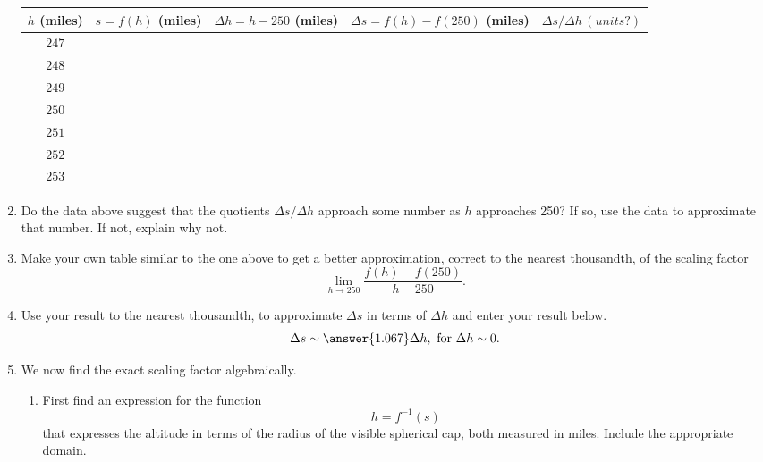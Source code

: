 \documentclass{ximera}
\begin{document}
\begin{question}
\begin{enumerate}
\begin{center}
  \begin{tabular}{ | c| c | c | c | c |}
    \hline
    $h$ (miles) & $s = f(h)$ (miles) & $\Delta h = h-250$ (miles)  & $\Delta s =f(h) - f(250)$ (miles) & $\Delta s/\Delta h \, (units?)$ \\ \hline
     $247$ &  &  &   & \\ \hline
    $248$ &  &  &   & \\ \hline
    $249$ &  &  &   &  \\ \hline
    $250$  &  &  &  &   \\ \hline
    $251$ &  &  &   &  \\ \hline
    $252$ &  &  &   &  \\ \hline
    $253$ &  &  &   &  \\ \hline
    \hline
  \end{tabular}
\end{center}

\item Do the data above suggest that the quotients $\Delta s / \Delta h$ approach some number as $h$ approaches 250? If so, use the data to approximate that number. If not, explain why not.

\item Make your own table similar to the one above to get a better approximation, correct to the nearest thousandth, of the scaling factor
\[
   \lim_{h\to 250} \frac{f(h) - f(250)}{h-250} .
\]

\item Use your result to the nearest thousandth, to approximate $\Delta s$ in terms of $\Delta h$ and enter your result below.
\[
  \Delta s \sim \answer{1.067} \Delta h , \text{ for } \Delta h \sim 0.
\] 

\item We now find the exact scaling factor algebraically.

\begin{enumerate}
\item First find an expression for the function
\[
     h = f^{-1}(s) 
\]
that expresses the altitude in terms of the radius of the visible spherical cap, both measured in miles. Include the appropriate domain.


\end{enumerate}
\end{enumerate}
\end{question}
\end{document}
